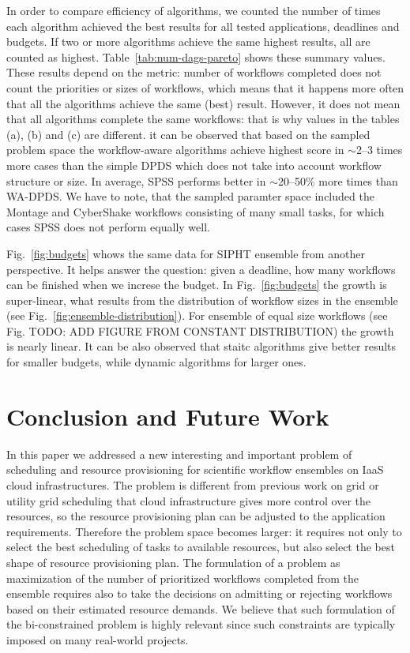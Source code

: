 \documentclass{sig-alternate}
\begin{document}
               
In order to compare efficiency of algorithms, we counted the number of times
each algorithm achieved the best results for all tested applications, deadlines
and budgets. If two or more algorithms achieve the same highest results, all are
counted as highest. Table~\ref{tab:num-dags-pareto} shows these summary values.
These results depend on the metric: number of workflows completed does not count
the priorities or sizes of workflows, which means that it happens more often
that all the algorithms achieve the same (best) result. However, it does not
mean that all algorithms complete the same workflows: that is why values
in the tables (a), (b) and (c) are different. it can be observed that based on
the sampled problem space the workflow-aware algorithms achieve highest score
in $\sim$2--3 times more cases than the simple DPDS which does not take into
account workflow structure or size. In average, SPSS performs better in
$\sim$20--50\% more times than WA-DPDS. We have to note, that the sampled
paramter space included the Montage and CyberShake workflows consisting of many
small tasks, for which cases SPSS does not perform equally well. 
               
               
Fig.~\ref{fig:budgets} whows the same data for SIPHT ensemble from another
perspective. It helps answer the question: given a deadline, how many workflows
can be finished when we increse the budget. In Fig.~\ref{fig:budgets} the growth
is super-linear, what results from the distribution of workflow sizes in the
ensemble (see Fig.~\ref{fig:ensemble-distribution}). For ensemble of equal size
workflows (see Fig. TODO: ADD FIGURE FROM CONSTANT DISTRIBUTION) the growth is
nearly linear. It can be also observed that staitc algorithms give better
results for smaller budgets, while dynamic algorithms for larger ones.




\section{Conclusion and Future Work}

In this paper we addressed a new interesting and important problem of scheduling
and resource provisioning for scientific workflow ensembles on IaaS cloud
infrastructures. The problem is different from previous work on grid or utility
grid scheduling that cloud infrastructure gives more control over the resources,
so the resource provisioning plan can be adjusted to the application
requirements. Therefore the problem space becomes larger: it requires not
only to select the best scheduling of tasks to available resources, but also
select the best shape of resource provisioning plan. The formulation of a
problem as maximization of the number of prioritized workflows completed from
the ensemble requires also to take the decisions on admitting or rejecting workflows
based on their estimated resource demands. We believe that such formulation of
the bi-constrained problem is highly relevant since such
constraints are typically imposed on many real-world projects.
\end{document}

